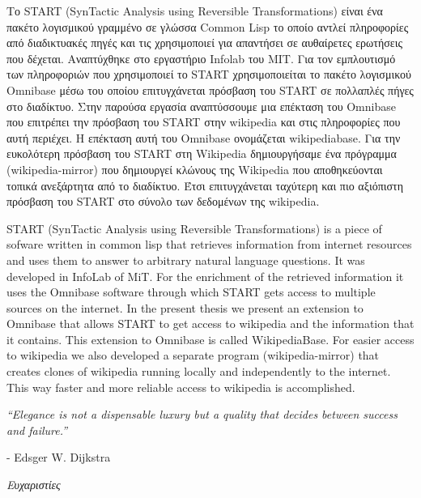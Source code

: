 Το START (SynTactic Analysis using Reversible Transformations) είναι
ένα πακέτο λογισμικού γραμμένο σε γλώσσα Common Lisp το οποίο αντλεί
πληροφορίες από διαδικτυακές πηγές και τις χρησιμοποιεί για
απαντήσει σε αυθαίρετες ερωτήσεις που δέχεται. Αναπτύχθηκε στο
εργαστήριο Infolab του MIT. Για τον εμπλουτισμό των πληροφοριών που
χρησιμοποιεί το START χρησιμοποιείται το πακέτο λογισμικού Omnibase
μέσω του οποίου επιτυγχάνεται πρόσβαση του START σε πολλαπλές πήγες
στο διαδίκτυο. Στην παρούσα εργασία αναπτύσσουμε μια επέκταση του
Omnibase που επιτρέπει την πρόσβαση του START στην wikipedia και
στις πληροφορίες που αυτή περιέχει. Η επέκταση αυτή του Omnibase
ονομάζεται wikipediabase.  Για την ευκολότερη πρόσβαση του START στη
Wikipedia δημιουργήσαμε ένα πρόγραμμα (wikipedia-mirror) που
δημιουργεί κλώνους της Wikipedia που αποθηκεύονται τοπικά ανεξάρτητα
από το διαδίκτυο.  Έτσι επιτυγχάνεται ταχύτερη και πιο αξιόπιστη
πρόσβαση του START στο σύνολο των δεδομένων της wikipedia.

\vspace{2.2cm}

START (SynTactic Analysis using Reversible Transformations) is a
piece of sofware written in common lisp that retrieves information
from internet resources and uses them to answer to arbitrary natural
language questions. It was developed in InfoLab of MiT. For the
enrichment of the retrieved information it uses the Omnibase
software through which START gets access to multiple sources on the
internet. In the present thesis we present an extension to Omnibase
that allows START to get access to wikipedia and the information
that it contains. This extension to Omnibase is called
WikipediaBase. For easier access to wikipedia we also developed a
separate program (wikipedia-mirror) that creates clones of wikipedia
running locally and independently to the internet. This way faster
and more reliable access to wikipedia is accomplished.

\vspace{3cm}
\begin{flushleft}
\textit{``Elegance is not a dispensable luxury but a quality that decides between success and failure.''}
\end{flushleft}
\begin{flushright}
- Edsger W. Dijkstra
\end{flushright}
\afterpage{\blankpage}
\newpage


\thispagestyle{plain}
\vspace*{1in}
\begin{center}
\begin{Large}
\textit{Ευχαριστίες}
\end{Large}
\end{center}

